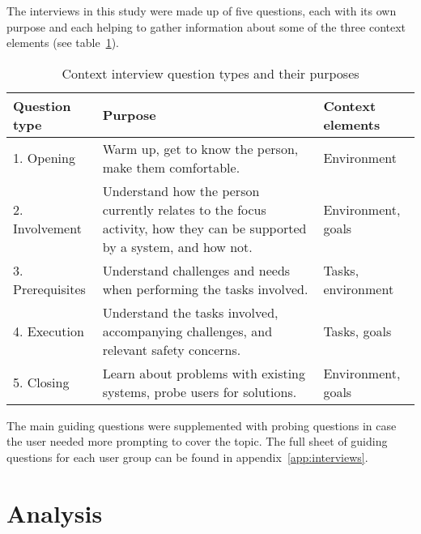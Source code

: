 The interviews in this study were made up of five questions, each with its own purpose and each helping to gather information about some of the three context elements (see table~\ref{tab:interview_questions}).

\begin{table}[ht]
\begin{tabular}{|l|p{}|l|}
\hline
\rowcolor{lightgray}
\textbf{Question type} & \textbf{Purpose}                                                                  & \textbf{Context elements} \\ \hline
1. Opening                                       & Warm up, get to know the person, make them comfortable.                                                                & Environment                                         \\ \hline
2. Involvement                                   & Understand how the person currently relates to the focus activity, how they can be supported by a system, and how not. & Environment, goals                                  \\ \hline
3. Prerequisites                                 & Understand challenges and needs when performing the tasks involved.                                                    & Tasks, environment                                  \\ \hline
4. Execution                                     & Understand the tasks involved, accompanying challenges, and relevant safety concerns.                                  & Tasks, goals                                        \\ \hline
5. Closing                                       & Learn about problems with existing systems, probe users for solutions.                                                 & Environment, goals                                  \\ \hline
\end{tabular}
\caption{Context interview question types and their purposes}
\label{tab:interview_questions}
\end{table}

The main guiding questions were supplemented with probing questions in case the user needed more prompting to cover the topic. The full sheet of guiding questions for each user group can be found in appendix~\ref{app:interviews}.


\section{Analysis}

